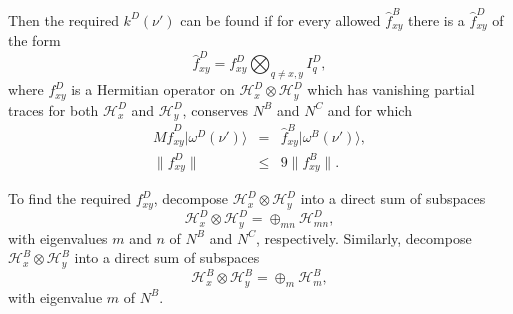 \documentclass[12pt,amsmath,amssymb,onecolumn]{revtex4-2}
\begin{document}
Then the required $k^D( \nu')$ can be found
if for every allowed $\hat{ f}^B_{xy}$ there is a
$\hat{ f}^D_{xy}$ of the form
\begin{equation}
\label{defhf4}
\hat{ f}^D_{xy} =  f^D_{xy} \bigotimes_{q \ne x,y} I^D_q, 
\end{equation}
where $f^D_{xy}$ is a Hermitian operator on
$\mathcal{H}^D_x \otimes \mathcal{H}^D_y$
which has vanishing partial traces
for both $\mathcal{H}^D_x$ and $\mathcal{H}^D_y$,
conserves $N^B$ and $N^C$ and
for which
\begin{subequations}
  \begin{eqnarray}
  \label{omegaw1}
  M \hat{ f}^D_{xy}|\omega^D(\nu') \rangle  &=& \hat{ f}^B_{xy}|\omega^B(\nu') \rangle , \\
  \label{normkw1}
  \parallel f^D_{xy} \parallel &\le& 9 \parallel f^B_{xy} \parallel.
  \end{eqnarray}
  \end{subequations}

To find the required $f^D_{xy}$, decompose $\mathcal{H}^D_x \otimes \mathcal{H}^D_y$
into a direct sum of subspaces
\begin{equation}
  \label{directsumd}
  \mathcal{H}^D_x \otimes \mathcal{H}^D_y = \oplus_{mn} \mathcal{H}^D_{mn},
\end{equation}
with eigenvalues $m$ and $n$ of $N^B$ and $N^C$, respectively.
Similarly, decompose $\mathcal{H}^B_x \otimes \mathcal{H}^B_y$
into a direct sum of subspaces
\begin{equation}
  \label{directsumd1}
  \mathcal{H}^B_x \otimes \mathcal{H}^B_y = \oplus_m \mathcal{H}^B_m,
\end{equation}
with eigenvalue $m$ of $N^B$.
\end{document}
